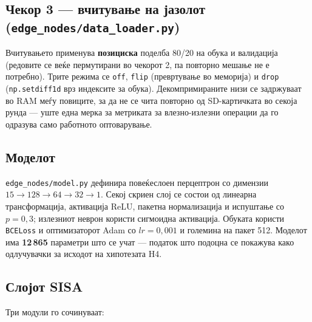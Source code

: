 \subsection{Чекор 3 --- вчитување на јазолот (\texttt{edge\_nodes/data\_loader.py})}

Вчитувањето применува \textbf{позициска} поделба 80/20 на обука и валидација (редовите се веќе
пермутирани во чекорот 2, па повторно мешање не е потребно). Трите режима се \texttt{off},
\texttt{flip} (превртување во меморија) и \texttt{drop} (\texttt{np.setdiff1d} врз индексите за обука).
Декомпримираните низи се задржуваат во RAM меѓу повиците, за да не се чита повторно од
SD-картичката во секоја рунда --- уште една мерка за метриката за влезно-излезни операции да
го одразува само работното оптоварување.

\subsection{Моделот}

\texttt{edge\_nodes/model.py} дефинира повеќеслоен перцептрон со димензии
$15 \to 128 \to 64 \to 32 \to 1$. Секој скриен слој се состои од линеарна трансформација,
активација ReLU, пакетна нормализација и испуштање со $p = 0{,}3$; излезниот неврон користи
сигмоидна активација. Обуката користи \texttt{BCELoss} и оптимизаторот Adam со $lr = 0{,}001$ и
големина на пакет 512. Моделот има \textbf{12\,865} параметри што се учат --- податок што подоцна се
покажува како одлучувачки за исходот на хипотезата H4.

\subsection{Слојот SISA}

Три модули го сочинуваат:

